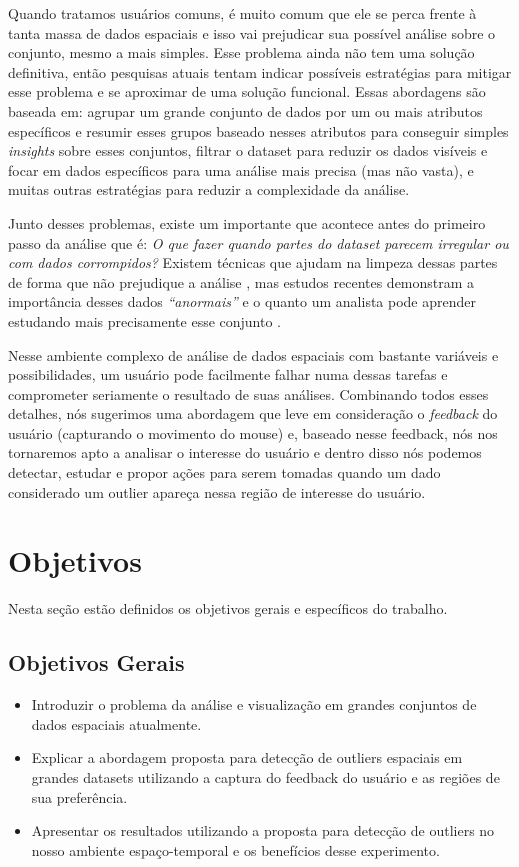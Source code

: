 Quando tratamos usuários comuns, é muito comum que ele se perca frente à tanta massa de dados espaciais e isso vai prejudicar sua possível análise sobre o conjunto, mesmo a mais simples. Esse problema ainda não tem uma solução definitiva, então pesquisas atuais tentam indicar possíveis estratégias para mitigar esse problema e se aproximar de uma solução funcional. Essas abordagens são baseada em: agrupar um grande conjunto de dados por um ou mais atributos específicos e resumir esses grupos baseado nesses atributos para conseguir simples \textit{insights} sobre esses conjuntos, filtrar o dataset para reduzir os dados visíveis e focar em dados específicos para uma análise mais precisa (mas não vasta), e muitas outras estratégias para reduzir a complexidade da análise.

Junto desses problemas, existe um importante que acontece antes do primeiro passo da análise que é: \textit{O que fazer quando partes do dataset parecem irregular ou com dados corrompidos?} Existem técnicas que ajudam na limpeza dessas partes de forma que não prejudique a análise \cite{10.1007/978-3-319-11116-2_2}, mas estudos recentes demonstram a importância desses dados \textit{``anormais''} e o quanto um analista pode aprender estudando mais precisamente esse conjunto \cite{DBLP:journals/debu/FreireCVZ16}.

Nesse ambiente complexo de análise de dados espaciais com bastante variáveis e possibilidades, um usuário pode facilmente falhar numa dessas tarefas e comprometer seriamente o resultado de suas análises. Combinando todos esses detalhes, nós sugerimos uma abordagem que leve em consideração o \textit{feedback} do usuário (capturando o movimento do mouse) e, baseado nesse feedback, nós nos tornaremos apto a analisar o interesse do usuário e dentro disso nós podemos detectar, estudar e propor ações para serem tomadas quando um dado considerado um outlier apareça nessa região de interesse do usuário.

\section{Objetivos}

Nesta seção estão definidos os objetivos gerais e específicos do trabalho.

\subsection{Objetivos Gerais}

\begin{itemize}
	\item
	      Introduzir o problema da análise e visualização em grandes conjuntos de dados espaciais atualmente.
	\item
	      Explicar a abordagem proposta para detecção de outliers espaciais em grandes datasets utilizando a captura do feedback do usuário e as regiões de sua preferência.
	\item
	      Apresentar os resultados utilizando a proposta para detecção de outliers no nosso ambiente espaço-temporal e os benefícios desse experimento.

\end{itemize}

